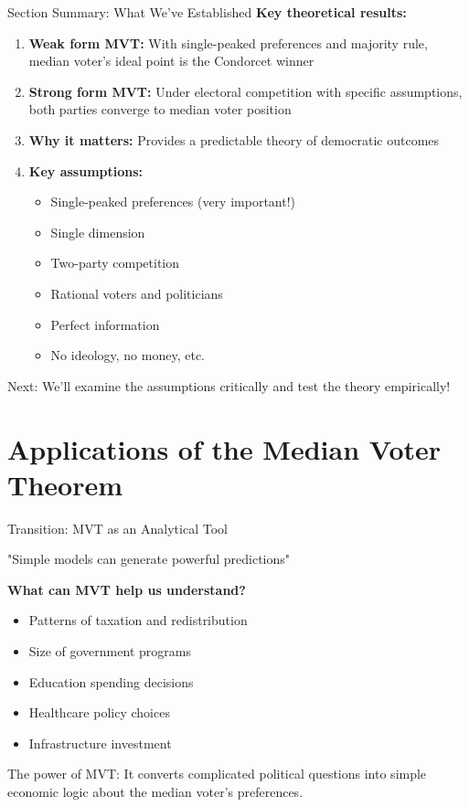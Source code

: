\documentclass[10pt]{beamer}
\begin{document}
\begin{frame}{Section Summary: What We've Established}
\textbf{Key theoretical results:}

\begin{enumerate}
\item \textbf{Weak form MVT:} With single-peaked preferences and majority rule, median voter's ideal point is the Condorcet winner


\item \textbf{Strong form MVT:} Under electoral competition with specific assumptions, both parties converge to median voter position


\item \textbf{Why it matters:} Provides a predictable theory of democratic outcomes


\item \textbf{Key assumptions:}
\begin{itemize}
\item Single-peaked preferences (very important!)
\item Single dimension
\item Two-party competition
\item Rational voters and politicians
\item Perfect information
\item No ideology, no money, etc.
\end{itemize}
\end{enumerate}



\alert{Next:} We'll examine the assumptions critically and test the theory empirically!
\end{frame}


\section{Applications of the Median Voter Theorem}

\begin{frame}{Transition: MVT as an Analytical Tool}
\begin{center}
\Large "Simple models can generate powerful predictions"
\end{center}


\vspace{1cm}

\textbf{What can MVT help us understand?}
\begin{itemize}
\item Patterns of taxation and redistribution
\item Size of government programs
\item Education spending decisions
\item Healthcare policy choices
\item Infrastructure investment
\end{itemize}



\alert{The power of MVT:} It converts complicated political questions into simple economic logic about the median voter's preferences.
\end{frame}
\end{document}
